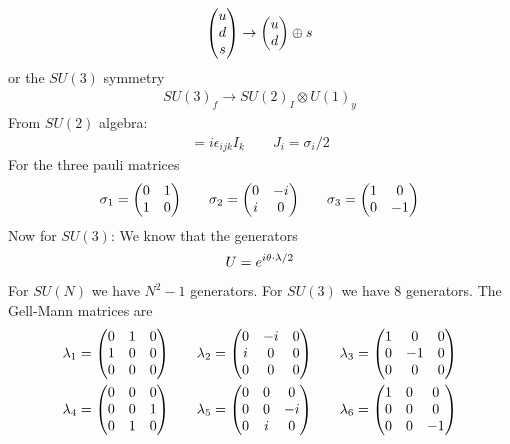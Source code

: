 \documentclass[../main.tex]{subfiles}
\begin{document}
\begin{align*}
    \mqty(u \\ d \\ s) \to \mqty(u \\ d) \oplus s
\end{align*}
or the $SU(3)$ symmetry
\begin{align*}
    SU(3)_f \to SU(2)_I \otimes U(1)_y
\end{align*}
From $SU(2)$ algebra:
\begin{align*}
    [J_i, J_j] = i \epsilon_{ijk} I_k \qquad J_i = \sigma_i / 2
\end{align*}
For the three pauli matrices
\begin{align*}
    \sigma_1 = \mqty(0 & 1 \\ 1 & 0) \qquad 
    \sigma_2 = \mqty(0 & -i \\ i & 0) \qquad
    \sigma_3 = \mqty(1 & 0 \\ 0 & -1)
\end{align*}
Now for $SU(3)$: We know that the generators
\begin{align*}
    U = e^{i \vb{\theta} \cdot \vb{\lambda}/2}
\end{align*}
For $SU(N)$ we have $N^2 - 1$ generators. For $SU(3)$ we have 8 generators. The Gell-Mann matrices
are 
\begin{align*}
    \lambda_1 &= \mqty(0 & 1 & 0 \\ 1 & 0 & 0 \\ 0 & 0 & 0) \qquad
    \lambda_2 = \mqty(0 & -i & 0 \\ i & 0 & 0 \\ 0 & 0 & 0) \qquad
    \lambda_3 = \mqty(1 & 0 & 0 \\ 0 & -1 & 0 \\ 0 & 0 & 0) \\
    \lambda_4 &= \mqty(0 & 0 & 0 \\ 0 & 0 & 1 \\ 0 & 1 & 0) \qquad
    \lambda_5 = \mqty(0 & 0 & 0 \\ 0 & 0 & -i \\ 0 & i & 0) \qquad
    \lambda_6 = \mqty(1 & 0 & 0 \\ 0 & 0 & 0 \\ 0 & 0 & -1)
\end{align*}
\end{document}
